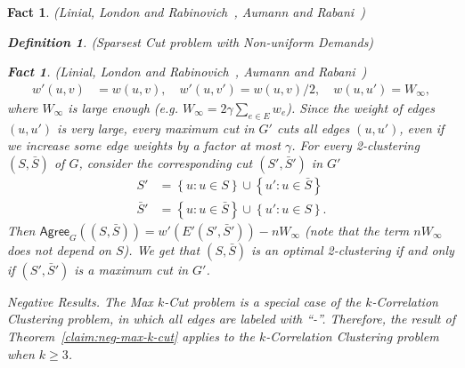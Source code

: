 \documentclass[twoside,leqno,twocolumn]{article}
\makeatletter
\def\paragraph{\@startsection  
 {paragraph}{4}{\parindent}{5pt}{-5pt}{\normalsize\bf}}
\newcommand {\set}   [1] {\left\{ #1 \right\}}
\newtheorem{Definition}[theorem]{Definition}
\newtheorem{fact}[theorem]{Fact}
\makeatother
\begin{document}
\begin{fact}{\sc (Linial, London and Rabinovich~\cite{LLR}, Aumann and Rabani~\cite{AR})}
\begin{Definition} {\sc (Sparsest Cut problem with Non-uniform Demands)}
\begin{fact}{\sc (Linial, London and Rabinovich~\cite{LLR}, Aumann and Rabani~\cite{AR})}
\begin{align*}
w'(u,v) &= w(u,v), \quad w'(u,v') = w(u,v) /2, \quad w(u,u') = W_{\infty},
\end{align*}
\fi
where $W_{\infty}$ is large enough (e.g. $W_{\infty} = 2\gamma \sum_{e\in E} w_e$). Since the weight of edges $(u,u')$ is very large, every maximum cut in $G'$ cuts all edges $(u,u')$, even if we increase
some edge weights by a factor at most $\gamma$. For every 2-clustering $(S,\bar S)$ of $G$, consider the corresponding cut $(S', \bar S')$ in $G'$
\begin{align*}
S' &= \set{u: u\in S} \cup \set{u': u\in \bar S} \\
\bar S' &= \set{u: u\in \bar S} \cup \set{u': u\in S}.
\end{align*}
Then $\mathsf{Agree}_G((S, \bar S))= w'(E'(S', \bar S')) - nW_{\infty}$ (note that the term $nW_{\infty}$ does not depend on $S$).
We get that $(S,\bar S)$ is an optimal 2-clustering if and only if $(S', \bar S')$ is a maximum cut in $G'$.


\paragraph{Negative Results.} The Max $k$-Cut problem is a special case of the $k$-Correlation Clustering problem, in which all edges
are labeled with ``-''. Therefore, the result of Theorem~\ref{claim:neg-max-k-cut} applies to the $k$-Correlation Clustering problem when $k \geq 3$.



\end{fact}
\end{Definition}
\end{fact}
\end{document}
